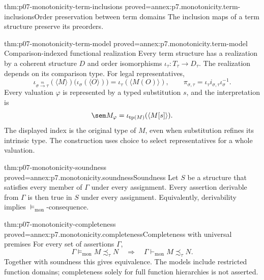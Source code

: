 \begin{hblemma}{thm:p07-monotonicity-term-inclusions}
 {proved=annex:p7.monotonicity.term-inclusions}{Order preservation between term domains}
The inclusion maps of a term structure preserve its preorders.
\end{hblemma}

\begin{hblemma}{thm:p07-monotonicity-term-model}
 {proved=annex:p7.monotonicity.term-model}
 {Comparison-indexed functional realization}
Every term structure has a realization by a coherent structure \(D\)
and order isomorphisms \(\iota_\tau:T_\tau\to D_\tau\).
The realization depends on its comparison type. For legal representatives,
\[
 \iota_{\sigma\xrightarrow m\tau}(\langle M\rangle)
       \bigl(\iota_\sigma(\langle O\rangle)\bigr)
   =\iota_\tau(\langle M(O)\rangle),
\qquad
 \pi_{\sigma,\tau}
   =\iota_\tau i_{\sigma,\tau}\iota_\sigma^{-1}.
\]
Every valuation \(\varphi\) is represented by a typed substitution \(s\),
and the interpretation is
\[
 \sem M_\varphi
    =\iota_{\operatorname{tp}(M)}(\langle M[s]\rangle).
\]
The displayed index is the original type of \(M\), even when substitution
refines its intrinsic type. The construction uses choice to select
representatives for a whole valuation.
\end{hblemma}

\begin{hbtheorem}{thm:p07-monotonicity-soundness}
 {proved=annex:p7.monotonicity.soundness}{Soundness}
Let \(S\) be a structure that satisfies every member of \(\Gamma\) under
every assignment.
Every assertion derivable from \(\Gamma\) is then true in \(S\) under
every assignment. Equivalently, derivability implies
\(\models_{\mathrm{mon}}\)-consequence.
\end{hbtheorem}

\begin{hbtheorem}{thm:p07-monotonicity-completeness}
 {proved=annex:p7.monotonicity.completeness}{Completeness with universal premises}
For every set of assertions \(\Gamma\),
\[
 \Gamma\models_{\mathrm{mon}}M\precsim_\tau N
 \quad\Longrightarrow\quad
 \Gamma\vdash_{\mathrm{mon}}M\precsim_\tau N .
\]
Together with soundness this gives equivalence. The models include
restricted function domains; completeness solely for full function
hierarchies is not asserted.
\end{hbtheorem}

